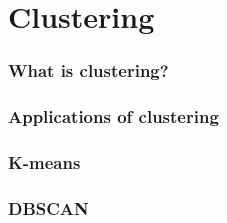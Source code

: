 \documentclass[smaller]{beamer}
\theoremstyle{example}
\begin{document}




\section{Clustering}

\begin{frame}
    \frametitle{What is clustering?}
\end{frame}

\begin{frame}
    \frametitle{Applications of clustering}
\end{frame}

\begin{frame}
    \frametitle{K-means}
\end{frame}

\begin{frame}
    \frametitle{DBSCAN}
\end{frame}
\end{document}
